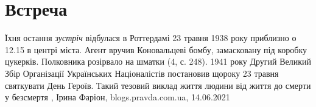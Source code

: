  
 
 
 
 
\chapter{Встреча}

Їхня остання \emph{зустріч} відбулася в Роттердамі 23 травня 1938 року
приблизно о 12.15 в центрі міста. Агент вручив Коновальцеві бомбу, замасковану
під коробку цукерків. Полковника розірвало на шматки (4, с. 248).  1941 року
Другий Великий Збір Організації Українських Націоналістів постановив щороку 23
травня святкувати День Героїв. Такий тезовий виклад життя людини від життя до
смерти у безсмертя
, 
Ірина Фаріон, blogs.pravda.com.ua, 14.06.2021

